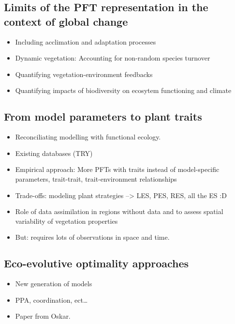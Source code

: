 \documentclass[oneside]{book}
\providecommand{\tightlist}{%
  \setlength{\itemsep}{0pt}\setlength{\parskip}{0pt}}
\begin{document}
\subsection{Limits of the PFT representation in the context of global
change}\label{limits-of-the-pft-representation-in-the-context-of-global-change}

\begin{itemize}
\tightlist
\item
  Including acclimation and adaptation processes
\item
  Dynamic vegetation: Accounting for non-random species turnover
\item
  Quantifying vegetation-environment feedbacks
\item
  Quantifying impacts of biodiversity on ecosytem functioning and
  climate
\end{itemize}

\subsection{From model parameters to plant
traits}\label{from-model-parameters-to-plant-traits}

\begin{itemize}
\tightlist
\item
  Reconciliating modelling with functional ecology.
\item
  Existing databases (TRY)
\item
  Empirical approach: More PFTs with traits instead of model-specific
  parameters, trait-trait, trait-environment relationships
\item
  Trade-offs: modeling plant strategies --\textgreater{} LES, PES, RES,
  all the ES :D
\item
  Role of data assimilation in regions without data and to assess
  spatial variability of vegetation properties
\item
  But: requires lots of observations in space and time.
\end{itemize}

\subsection{Eco-evolutive optimality
approaches}\label{eco-evolutive-optimality-approaches}

\begin{itemize}
\tightlist
\item
  New generation of models
\item
  PPA, coordination, ect\ldots{}
\item
  Paper from Oskar.
\end{itemize}
\end{document}
